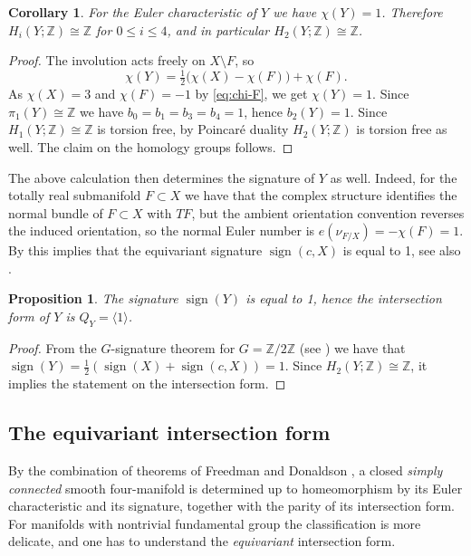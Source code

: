 \documentclass[11pt]{amsart}
\newtheorem{proposition}[theorem]{Proposition}
\newtheorem{corollary}[theorem]{Corollary}
\theoremstyle{definition}
\theoremstyle{remark}
\newcommand{\Z}{\mathbb Z}
\newcommand{\sgn}{\operatorname{sign}}
\begin{document}
\begin{corollary}\label{cor:chi-Y}
  For the Euler characteristic of $Y$ we have $\chi(Y)=1$.  Therefore
  $H_i(Y;\Z)\cong\Z$ for $0\le i\le4$, and in particular
  $H_2(Y;\Z)\cong\Z$. 
\end{corollary}

\begin{proof}
The involution acts freely on $X\setminus F$, so
\[
 \chi(Y)=\tfrac12\bigl(\chi(X)-\chi(F)\bigr)+\chi(F).
\]
As $\chi(X)=3$ and $\chi(F)=-1$ by \eqref{eq:chi-F}, we get $\chi(Y)=1$.
Since $\pi_1(Y)\cong\Z$ we have $b_0=b_1=b_3=b_4=1$, hence $b_2(Y)=1$. Since
$H_1(Y;\Z)\cong\Z$ is torsion free, by Poincar\'e duality $H_2(Y;\Z)$ is
torsion free as well.  The claim on the homology groups follows.
\end{proof}

The above calculation then determines the signature of $Y$ as well.
Indeed, for the totally real submanifold $F\subset X$ we have that the
complex structure identifies the normal bundle of $F\subset X$ with
$TF$, but the ambient orientation convention reverses the induced
orientation, so the normal Euler number is
$e(\nu_{F/X})=-\chi(F)=1$.
By \cite{JO} this implies that the
equivariant signature $\sgn(c, X)$ is equal to 1, see also \cite{Hirzebruch}.

\begin{proposition}\label{prop:intformZ}
  The signature $\sgn (Y)$ is equal to 1, hence the intersection form of $Y$ is $Q_Y=\langle 1\rangle $.
  \end{proposition}
\begin{proof}
  From the $G$-signature theorem for $G=\Z/2\Z$ (see
  \cite{Hirzebruch}) we have that  $\sgn (Y)=\frac{1}{2}(\sgn (X)+
  \sgn (c, X))=1$. Since $H_2(Y; \Z )\cong \Z$, it implies the statement
  on the intersection form.
  \end{proof}

\subsection{The equivariant intersection form}
\label{sec:equivariant-form}

By the combination of theorems of Freedman \cite{Fr} and Donaldson
\cite{Do}, a closed \emph{simply connected} smooth four-manifold is determined up
to homeomorphism by its Euler characteristic and its signature, together
with the parity of its intersection form.  For manifolds with nontrivial
fundamental group the classification is more delicate, and one has to
understand the \emph{equivariant} intersection form.
\end{document}

